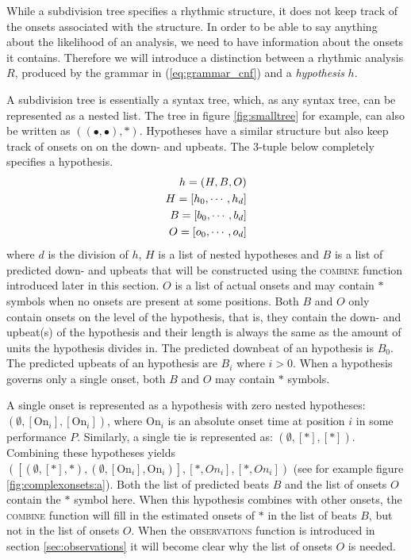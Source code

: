 While a subdivision tree specifies a rhythmic structure, it does not keep track of the onsets associated with the structure. In order to be able to say anything about the likelihood of an analysis, we need to have information about the onsets it contains. Therefore we will introduce a distinction between a rhythmic analysis $R$, produced by the grammar in (\ref{eq:grammar_cnf}) and a \textit{hypothesis} $h$. 

A subdivision tree is essentially a syntax tree, which, as any syntax tree, can be represented as a nested list. The tree in figure \ref{fig:smalltree} for example, can also be written as $((\bullet, \bullet), *)$. Hypotheses have a similar structure but also keep track of onsets on on the down- and upbeats. The 3-tuple below completely specifies a hypothesis.
\begin{align}
h = (H, B, O)\\ \notag
H = [h_0, \cdots, h_d]\\ \notag
B = [b_0, \cdots, b_d]\\ \notag
O = [o_0, \cdots, o_d] \notag
\end{align}
where $d$ is the division of $h$, $H$ is a list of nested hypotheses and $B$ is a list of predicted down- and upbeats that will be constructed using the \textsc{combine} function introduced later in this section. $O$ is a list of actual onsets and may contain $*$ symbols when no onsets are present at some positions. Both $B$ and $O$ only contain onsets on the level of the hypothesis, that is, they contain the down- and upbeat(s) of the hypothesis and their length is always the same as the amount of units the hypothesis divides in. The predicted downbeat of an hypothesis is $B_0$. The predicted upbeats of an hypothesis are $B_i$ where $i > 0$. When a hypothesis governs only a single onset, both $B$ and $O$ may contain $*$ symbols.

A single onset is represented as a hypothesis with zero nested hypotheses: $(\emptyset, [\textrm{On}_i], [\textrm{On}_i])$, where $\textrm{On}_i$ is an absolute onset time at position $i$ in some performance $P$. Similarly, a single tie is represented as: $(\emptyset, [*], [*])$. Combining these hypotheses yields $([(\emptyset, [*], *), (\emptyset, [\textrm{On}_i], \textrm{On}_i)], [*, On_i], [*, On_i])$ (see for example figure \ref{fig:complexonsets:a}). Both the list of predicted beats $B$ and the list of onsets $O$ contain the $*$ symbol here. When this hypothesis combines with other onsets, the \textsc{combine} function will fill in the estimated onsets of $*$ in the list of beats $B$, but not in the list of onsets $O$. When the \textsc{observations} function is introduced in section \ref{sec:observations} it will become clear why the list of onsets $O$ is needed.

